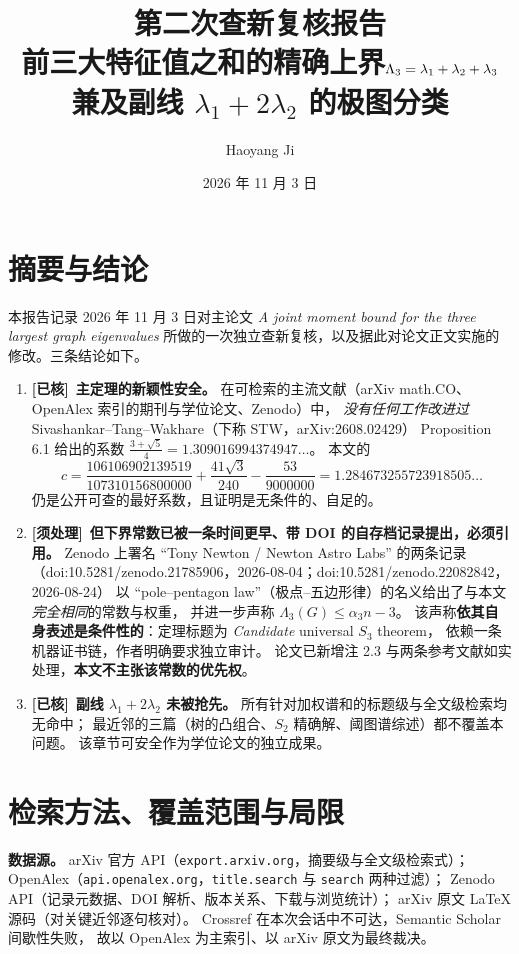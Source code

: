 \documentclass[UTF8,11pt]{ctexart}
\title{\bfseries 第二次查新复核报告\\[4pt]
\large 前三大特征值之和的精确上界\;$\Lam_3=\lambda_1+\lambda_2+\lambda_3$\\[2pt]
\normalsize 兼及副线 $\lambda_1+2\lambda_2$ 的极图分类}
\author{Haoyang Ji}
\date{2026 年 11 月 3 日}
\newcommand{\Lam}{\Lambda}
\newcommand{\ok}{\textcolor[rgb]{0.05,0.45,0.15}{\bfseries [已核]}}
\newcommand{\warn}{\textcolor[rgb]{0.72,0.28,0.02}{\bfseries [须处理]}}
\begin{document}
\maketitle

\section*{摘要与结论}

本报告记录 2026 年 11 月 3 日对主论文
\emph{A joint moment bound for the three largest graph eigenvalues}
所做的一次独立查新复核，以及据此对论文正文实施的修改。三条结论如下。

\begin{enumerate}[label=(\arabic*),leftmargin=2.2em]
\item \ok\ \textbf{主定理的新颖性安全。}
在可检索的主流文献（arXiv math.CO、OpenAlex 索引的期刊与学位论文、Zenodo）中，
\emph{没有任何工作改进过} Sivashankar--Tang--Wakhare（下称 STW，arXiv:2608.02429）
Proposition 6.1 给出的系数 $\frac{3+\sqrt5}{4}=1.309016994374947\ldots$。
本文的
\[
 c=\frac{106106902139519}{107310156800000}+\frac{41\sqrt3}{240}-\frac{53}{9000000}
  =1.284673255723918505\ldots
\]
仍是公开可查的最好系数，且证明是无条件的、自足的。

\item \warn\ \textbf{但下界常数已被一条时间更早、带 DOI 的自存档记录提出，必须引用。}
Zenodo 上署名 ``Tony Newton / Newton Astro Labs'' 的两条记录
（doi:10.5281/zenodo.21785906，2026-08-04；doi:10.5281/zenodo.22082842，2026-08-24）
以 ``pole--pentagon law''（极点--五边形律）的名义给出了与本文 \emph{完全相同}的常数与权重，
并进一步声称 $\Lam_3(G)\le\alpha_3n-3$。
该声称\textbf{依其自身表述是条件性的}：定理标题为 \emph{Candidate} universal $S_3$ theorem，
依赖一条机器证书链，作者明确要求独立审计。
论文已新增注 2.3 与两条参考文献如实处理，\textbf{本文不主张该常数的优先权}。

\item \ok\ \textbf{副线 $\lambda_1+2\lambda_2$ 未被抢先。}
所有针对加权谱和的标题级与全文级检索均无命中；
最近邻的三篇（树的凸组合、$S_2$ 精确解、阈图谱综述）都不覆盖本问题。
该章节可安全作为学位论文的独立成果。
\end{enumerate}

\section{检索方法、覆盖范围与局限}

\textbf{数据源。} arXiv 官方 API（\texttt{export.arxiv.org}，摘要级与全文级检索式）；
OpenAlex（\texttt{api.openalex.org}，\texttt{title.search} 与 \texttt{search} 两种过滤）；
Zenodo API（记录元数据、DOI 解析、版本关系、下载与浏览统计）；
arXiv 原文 LaTeX 源码（对关键近邻逐句核对）。
Crossref 在本次会话中不可达，Semantic Scholar 间歇性失败，
故以 OpenAlex 为主索引、以 arXiv 原文为最终裁决。
\end{document}
